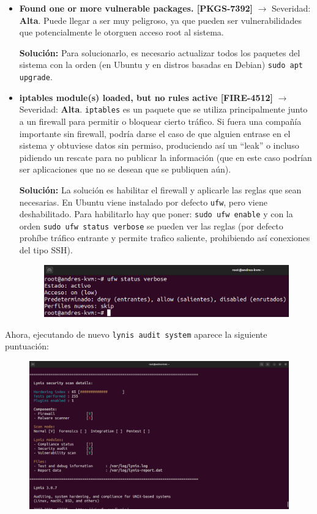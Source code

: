 \documentclass{article}
\begin{document}
\begin{itemize}
    \item \textbf{Found one or more vulnerable packages. [PKGS-7392]} $\rightarrow$ Severidad: \textbf{Alta}. Puede llegar a ser muy peligroso, ya que pueden ser vulnerabilidades que potencialmente le otorguen acceso root al sistema. 
    
    \textbf{Solución: }Para solucionarlo, es necesario actualizar todos los paquetes del sistema con la orden (en Ubuntu y en distros basadas en Debian) \verb|sudo apt upgrade|.


    \item \textbf{iptables module(s) loaded, but no rules active [FIRE-4512]} $\rightarrow$ Severidad: \textbf{Alta}. \verb|iptables| es un paquete que se utiliza principalmente junto a un firewall para permitir o bloquear cierto tráfico. Si fuera una compañía importante sin firewall, podría darse el caso de que alguien entrase en el sistema y obtuviese datos sin permiso, produciendo así un ``leak'' o incluso pidiendo un rescate para no publicar la información (que en este caso podrían ser aplicaciones que no se desean que se publiquen aún).
    
    \textbf{Solución: }La solución es habilitar el firewall y aplicarle las reglas que sean necesarias. En Ubuntu viene instalado por defecto \verb|ufw|, pero viene deshabilitado. Para habilitarlo hay que poner: \verb|sudo ufw enable| y con la orden \verb|sudo ufw status verbose| se pueden ver las reglas (por defecto prohíbe tráfico entrante y permite trafico saliente, prohibiendo así conexiones del tipo SSH).

    \begin{figure}[H]
        \includegraphics[width=\textwidth]{imagenes/ufwstatus.png}
    \end{figure}
\end{itemize}

Ahora, ejecutando de nuevo \verb|lynis audit system| aparece la siguiente puntuación:

\begin{figure}[H]
    \includegraphics[width=\textwidth]{imagenes/lynisresults2.png}
\end{figure}
\end{document}
